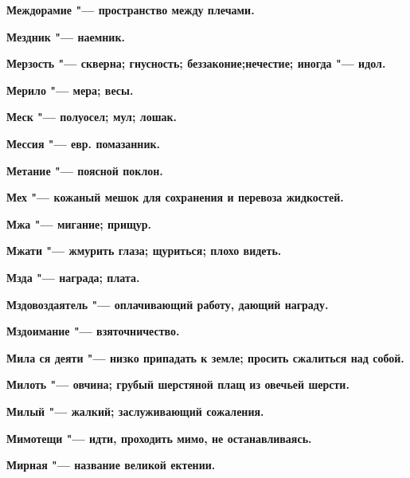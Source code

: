 \bfseries Междорамие \normalfont{} "--- пространство между плечами. 




\bfseries Мездник \normalfont{} "--- наемник. 




\bfseries Мерзость \normalfont{} "--- скверна; гнусность; беззаконие;нечестие; иногда "--- идол. 




\bfseries Мерило \normalfont{} "--- мера; весы. 




\bfseries Меск \normalfont{} "--- полуосел; мул; лошак. 




\bfseries Мессия \normalfont{} "--- евр. помазанник. 




\bfseries Метание \normalfont{} "--- поясной поклон. 




\bfseries Мех \normalfont{} "--- кожаный мешок для сохранения и перевоза жидкостей. 




\bfseries Мжа \normalfont{} "--- мигание; прищур. 




\bfseries Мжати \normalfont{} "--- жмурить глаза; щуриться; плохо видеть. 




\bfseries Мзда \normalfont{} "--- награда; плата. 




\bfseries Мздовоздаятель \normalfont{} "--- оплачивающий работу, дающий награду. 




\bfseries Мздоимание \normalfont{} "--- взяточничество. 




\bfseries Мила ся деяти \normalfont{} "--- низко припадать к земле; просить сжалиться над собой. 




\bfseries Милоть \normalfont{} "--- овчина; грубый шерстяной плащ из овечьей шерсти. 




\bfseries Милый \normalfont{} "--- жалкий; заслуживающий сожаления. 




\bfseries Мимотещи \normalfont{} "--- идти, проходить мимо, не останавливаясь. 




\bfseries Мирная \normalfont{} "--- название великой ектении. 




